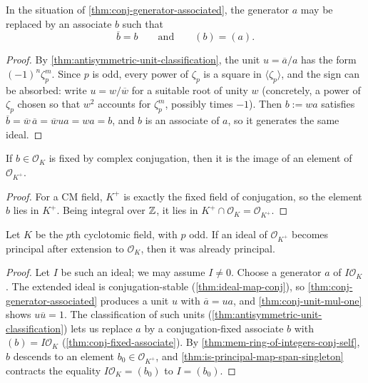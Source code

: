 \begin{theorem}\label{thm:conj-fixed-associate}
  \leanok
In the situation of \cref{thm:conj-generator-associated}, the generator $a$
may be replaced by an associate $b$ such that
\[
  \overline b=b
  \qquad\text{and}\qquad
  (b)=(a).
\]
\end{theorem}
\begin{proof}\leanok
By \cref{thm:antisymmetric-unit-classification}, the unit $u =
\overline a / a$ has the form $(-1)^n \zeta_p^m$.  Since $p$ is odd, every
power of $\zeta_p$ is a square in $\langle\zeta_p\rangle$, and the sign can
be absorbed: write $u = w/\overline w$ for a suitable root of unity $w$
(concretely, a power of $\zeta_p$ chosen so that $w^2$ accounts for
$\zeta_p^m$, possibly times $-1$).  Then $b := w a$ satisfies
$\overline b = \overline w\,\overline a = \overline w u a = w a = b$,
and $b$ is an associate of $a$, so it generates the same ideal.
\end{proof}

\begin{theorem}\label{thm:mem-ring-of-integers-conj-self}
  \leanok
If $b\in\mathcal O_K$ is fixed by complex conjugation, then it is the image
of an element of $\mathcal O_{K^+}$.
\end{theorem}
\begin{proof}\leanok
For a CM field, $K^+$ is exactly the fixed field of conjugation, so the
element $b$ lies in $K^+$.  Being integral over $\mathbb{Z}$, it lies in
$K^+ \cap \mathcal O_K = \mathcal O_{K^+}$.
\end{proof}

\begin{theorem}\label{thm:is-principal-after-extension}
  \leanok
Let $K$ be the $p$th cyclotomic field, with $p$ odd.  If an ideal of
$\mathcal O_{K^+}$ becomes principal after extension to $\mathcal O_K$,
then it was already principal.
\end{theorem}
\begin{proof}\leanok
Let $I$ be such an ideal; we may assume $I \ne 0$.  Choose a generator $a$
of $I\mathcal O_K$.  The extended ideal is conjugation-stable
(\cref{thm:ideal-map-conj}), so \cref{thm:conj-generator-associated}
produces a unit $u$ with $\overline a = ua$, and
\cref{thm:conj-unit-mul-one} shows $u\overline u = 1$.  The classification
of such units (\cref{thm:antisymmetric-unit-classification}) lets us
replace $a$ by a conjugation-fixed associate $b$ with $(b) = I\mathcal O_K$
(\cref{thm:conj-fixed-associate}).  By
\cref{thm:mem-ring-of-integers-conj-self}, $b$ descends to an element $b_0
\in \mathcal O_{K^+}$, and \cref{thm:is-principal-map-span-singleton}
contracts the equality $I\mathcal O_K = (b_0)$ to $I = (b_0)$.
\end{proof}

